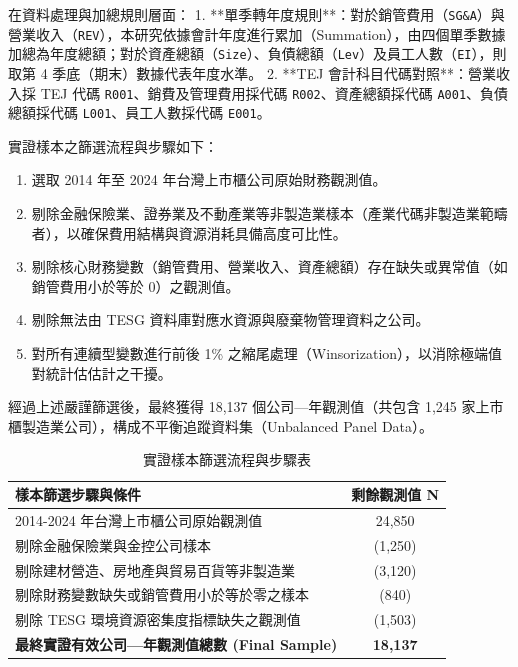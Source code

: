 \documentclass[12pt,a4paper]{article}
\begin{document}
在資料處理與加總規則層面：
1. **單季轉年度規則**：對於銷管費用（\texttt{SG\&A}）與營業收入（\texttt{REV}），本研究依據會計年度進行累加（Summation），由四個單季數據加總為年度總額；對於資產總額（\texttt{Size}）、負債總額（\texttt{Lev}）及員工人數（\texttt{EI}），則取第 4 季底（期末）數據代表年度水準。
2. **TEJ 會計科目代碼對照**：營業收入採 TEJ 代碼 \texttt{R001}、銷費及管理費用採代碼 \texttt{R002}、資產總額採代碼 \texttt{A001}、負債總額採代碼 \texttt{L001}、員工人數採代碼 \texttt{E001}。

實證樣本之篩選流程與步驟如下：
\begin{enumerate}[leftmargin=*]
    \item 選取 2014 年至 2024 年台灣上市櫃公司原始財務觀測值。
    \item 剔除金融保險業、證券業及不動產業等非製造業樣本（產業代碼非製造業範疇者），以確保費用結構與資源消耗具備高度可比性。
    \item 剔除核心財務變數（銷管費用、營業收入、資產總額）存在缺失或異常值（如銷管費用小於等於 0）之觀測值。
    \item 剔除無法由 TESG 資料庫對應水資源與廢棄物管理資料之公司。
    \item 對所有連續型變數進行前後 1\% 之縮尾處理（Winsorization），以消除極端值對統計估估計之干擾。
\end{enumerate}

經過上述嚴謹篩選後，最終獲得 18,137 個公司—年觀測值（共包含 1,245 家上市櫃製造業公司），構成不平衡追蹤資料集（Unbalanced Panel Data）。

\begin{table}[H]
\centering
\caption{實證樣本篩選流程與步驟表}
\label{tab:sample_selection}
\small
\begin{tabular}{lc}
\toprule
樣本篩選步驟與條件 & 剩餘觀測值 N \\
\midrule
2014-2024 年台灣上市櫃公司原始觀測值 & 24,850 \\
剔除金融保險業與金控公司樣本 & (1,250) \\
剔除建材營造、房地產與貿易百貨等非製造業 & (3,120) \\
剔除財務變數缺失或銷管費用小於等於零之樣本 & (840) \\
剔除 TESG 環境資源密集度指標缺失之觀測值 & (1,503) \\
\midrule
\textbf{最終實證有效公司—年觀測值總數 (Final Sample)} & \textbf{18,137} \\
\bottomrule
\end{tabular}
\end{table}
\end{document}
